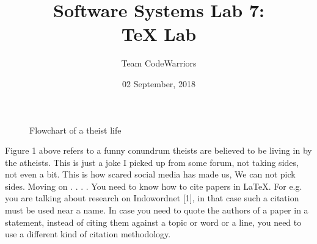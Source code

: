 \documentclass[15pt,a4paper]{article}
\begin{document}
\title{\textbf{Software Systems Lab 7:\\
TeX Lab}}
\author{Team CodeWarriors}
\date{02 September, 2018}
\begin{titlepage}
\maketitle
{}
\end{titlepage}

\newpage


\begin{figure}
\centering
{}
\caption{Flowchart of a theist life}
\end{figure}



\fontsize{11}{12}\selectfont
\par
\vspace{5mm}
Figure 1 above refers to a funny conundrum theists are believed to be
living in by the atheists. This is just a joke I picked up from some forum,
not taking sides, not even a bit. This is how scared social media has made
us, We can not pick sides. Moving on . . . . You need to know how to cite
papers in \LaTeX. For e.g. you are talking about research on Indowordnet
[1], in that case such a citation must be used near a name.  In case you
need to quote the authors of a paper in a statement, instead of citing them
against a topic or word or a line, you need to use a different kind of citation
methodology.
\end{document}
